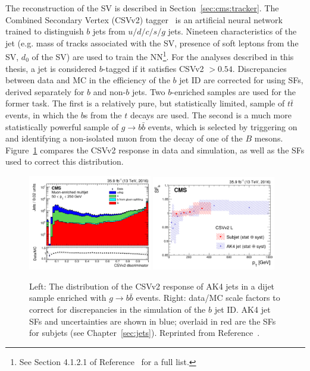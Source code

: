The reconstruction of the SV is described in Section~\ref{sec:cms:tracker}.
The Combined Secondary Vertex (CSVv2) tagger~\cite{csvv2} is an artificial neural network trained to distinguish $b$ jets from $u/d/c/s/g$ jets. 
Nineteen characteristics of the jet (e.g. mass of tracks associated with the SV, presence of soft leptons from the SV, $d_0$ of the SV) are used to train the NN\footnote{See Section 4.1.2.1 of Reference~\cite{csvv2} for a full list.}.
For the analyses described in this thesis, a jet is considered $b$-tagged if it satisfies CSVv2 $>0.54$. 
Discrepancies between data and MC in the efficiency of the $b$ jet ID are corrected for using SFs, derived separately for $b$ and non-$b$ jets.
Two $b$-enriched samples are used for the former task.
The first is a relatively pure, but statistically limited, sample of $t\bar{t}$ events, in which the $b$s from the $t$ decays are used.
The second is a much more statistically powerful sample of $g\rightarrow b\bar{b}$ events, which is selected by triggering on and identifying a non-isolated muon from the decay of one of the $B$ mesons. 
Figure~\ref{fig:cms:csvv2} compares the CSVv2 response in data and simulation, as well as the SFs used to correct this distribution.

\begin{figure}[]
\begin{center}
    \includegraphics[width=0.48\textwidth]{figures/cms/csvv2.png}
    \includegraphics[width=0.48\textwidth]{figures/cms/csvsf.png}
    \caption{Left: The distribution of the CSVv2 response of AK4 jets in a dijet sample enriched with $g\rightarrow b\bar{b}$ events.
             Right: data/MC scale factors to correct for discrepancies in the simulation of the $b$ jet ID.
             AK4 jet SFs and uncertainties are shown in blue; overlaid in red are the SFs for subjets (see Chapter~\ref{sec:jets}).
             Reprinted from Reference~\cite{csvv2}.}
    \label{fig:cms:csvv2}
\end{center}
\end{figure}

